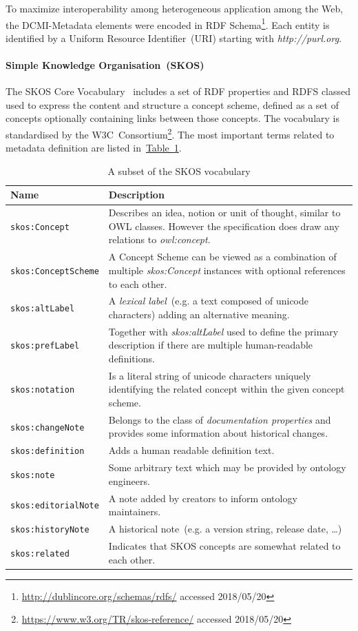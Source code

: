 \documentclass[draft,final]{vutinfth} %
\begin{document}
To maximize interoperability among heterogeneous application among the Web, the DCMI-Metadata elements were encoded in RDF Schema\footnote{\url{http://dublincore.org/schemas/rdfs/} accessed 2018/05/20}. Each entity is identified by a Uniform Resource Identifier~(URI) starting with \emph{http://purl.org}. 

\paragraph{Simple Knowledge Organisation~(SKOS)} The SKOS Core Vocabulary~\cite{skos2005} includes a set of RDF properties and RDFS classed used to express the content and structure a concept scheme, defined as a set of concepts optionally containing links between those concepts. The vocabulary is standardised by the W3C~Consortium\footnote{\url{https://www.w3.org/TR/skos-reference/} accessed 2018/05/20}. The most important terms related to metadata definition are listed in~\hyperref[table:skos]{Table~\ref*{table:skos}}.

\begingroup
\renewcommand{\arraystretch}{2}
\begin{table}
	\begin{tabularx}{\textwidth}{l|X}
		\textbf{Name} & \textbf{Description} \\
		\hline
		\texttt{skos:Concept} & Describes an idea, notion or unit of thought, similar to OWL classes. However the specification does draw any relations to \textit{owl:concept}.\\
		\texttt{skos:ConceptScheme} & A Concept Scheme can be viewed as a combination of multiple \textit{skos:Concept} instances with optional references to each other.\\
		\texttt{skos:altLabel} & A \textit{lexical label}~(e.g. a text composed of unicode characters) adding an alternative meaning. \\
		\texttt{skos:prefLabel} & Together with \textit{skos:altLabel} used to define the primary description if there are multiple human-readable definitions.\\
		\texttt{skos:notation} & Is a literal string of unicode characters uniquely identifying the related concept within the given concept scheme.\\
		\texttt{skos:changeNote} & Belongs to the class of \textit{documentation properties} and provides some information about historical changes.\\
		\texttt{skos:definition} & Adds a human readable definition text.\\
		\texttt{skos:note} & Some arbitrary text which may be provided by ontology engineers.\\
		\texttt{skos:editorialNote} & A note added by creators to inform ontology maintainers.\\
		\texttt{skos:historyNote} & A historical note~(e.g. a version string, release date, \ldots )\\
        \texttt{skos:related} & Indicates that SKOS concepts are somewhat related to each other.\\
	\end{tabularx}
	\caption{A subset of the SKOS vocabulary}
	\label{table:skos}
\end{table}
\endgroup
\end{document}
